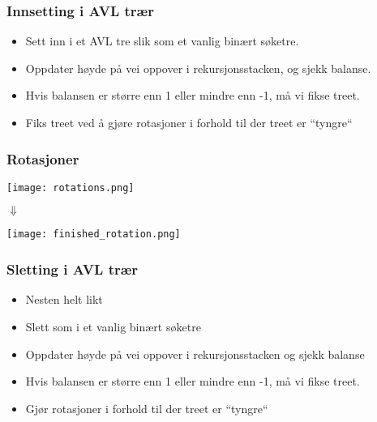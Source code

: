 \documentclass[norsk, handout]{beamer}
\begin{document}
    \begin{frame}
        \frametitle{Innsetting i AVL trær}
        \begin{itemize}
            \item Sett inn i et AVL tre slik som et vanlig binært søketre.
            \item Oppdater høyde på vei oppover i rekursjonsstacken, og sjekk balanse.
            \item Hvis balansen er større enn 1 eller mindre enn -1, må vi fikse treet.
            \item Fiks treet ved å gjøre rotasjoner i forhold til der treet er ``tyngre``
        \end{itemize}
    \end{frame}

    \begin{frame}
        \frametitle{Rotasjoner}
        \begin{center}
            \texttt{[image: rotations.png]}
        \end{center}
        \begin{center}
            $\Downarrow$
        \end{center}
        \begin{center}
            \texttt{[image: finished\_rotation.png]}
        \end{center}
    \end{frame}

    \begin{frame}
        \frametitle{Sletting i AVL trær}

        \begin{itemize}
            \item Nesten helt likt
            \item Slett som i et vanlig binært søketre
            \item Oppdater høyde på vei oppover i rekursjonsstacken og sjekk balanse
            \item Hvis balansen er større enn 1 eller mindre enn -1, må vi fikse treet.
            \item Gjør rotasjoner i forhold til der treet er ``tyngre``
        \end{itemize}
    \end{frame}
\end{document}
